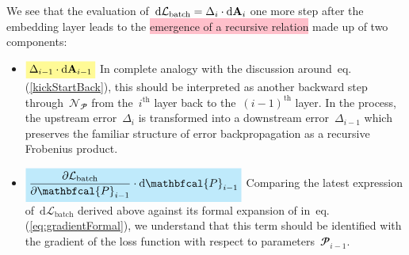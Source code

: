 \documentclass{article}
\newcommand{\mathcolorbox}[2]{\colorbox{#1}{$\displaystyle #2$}}
\begin{document}
\noindent We see that the evaluation of~$\text{d} \mathcal{L}_\text{batch} = \Delta_i \cdot \text{d} {\bf A}_i$ one more step after the embedding layer leads to the \colorbox{pink}{emergence of a recursive relation} made up of two components:
\begin{itemize}
\item $\mathcolorbox{shadecolor}{\Delta_{i-1} \cdot \text{d}{\bf A}_{i-1}}$  In complete analogy with the discussion around~eq.(\ref{kickStartBack}), this should be interpreted as another backward step through~$\mathcal{N}_\mathbfcal{P}$ from the~$i^\text{th}$ layer back to the~$(i-1)^\text{th}$ layer.  In the process, the upstream error~$\Delta_i$ is transformed into a downstream error~$\Delta_{i-1}$ which preserves the familiar structure of error backpropagation as a recursive Frobenius product.
\item $\mathcolorbox{light-blue}{\frac{\partial \mathcal{L}_{\text{batch}}}{\partial \mathbfcal{P}_{i-1}} \cdot \text{d} \mathbfcal{P}_{i-1}}$  Comparing the latest expression of~$\text{d} \mathcal{L}_\text{batch}$ derived above against its formal expansion of in~eq.(\ref{eq:gradientFormal}), we understand that this term should be identified with the gradient of the loss function with respect to parameters~$\mathbfcal{P}_{i-1}$.
\end{itemize}
\end{document}
